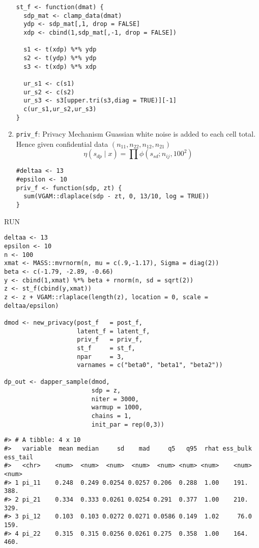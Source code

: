 \begin{enumerate}
\begin{verbatim}
st_f <- function(dmat) {
  sdp_mat <- clamp_data(dmat)
  ydp <- sdp_mat[,1, drop = FALSE]
  xdp <- cbind(1,sdp_mat[,-1, drop = FALSE])

  s1 <- t(xdp) %*% ydp
  s2 <- t(ydp) %*% ydp
  s3 <- t(xdp) %*% xdp

  ur_s1 <- c(s1)
  ur_s2 <- c(s2)
  ur_s3 <- s3[upper.tri(s3,diag = TRUE)][-1]
  c(ur_s1,ur_s2,ur_s3)
}
\end{verbatim}
\item
  \texttt{priv\_f}: Privacy Mechanism
  Guassian white noise is added to each cell total. Hence given
  confidential data \((n_{11}, n_{22}, n_{12}, n_{21})\)
  \[
  \eta(s_{dp} \mid x) = \prod \phi(s_{sd}; n_{ij}, 100^2)
  \]

\begin{verbatim}
#deltaa <- 13
#epsilon <- 10
priv_f <- function(sdp, zt) {
  sum(VGAM::dlaplace(sdp - zt, 0, 13/10, log = TRUE))
}
\end{verbatim}
\end{enumerate}

RUN

\begin{verbatim}
deltaa <- 13
epsilon <- 10
n <- 100
xmat <- MASS::mvrnorm(n, mu = c(.9,-1.17), Sigma = diag(2))
beta <- c(-1.79, -2.89, -0.66)
y <- cbind(1,xmat) %*% beta + rnorm(n, sd = sqrt(2))
z <- st_f(cbind(y,xmat))
z <- z + VGAM::rlaplace(length(z), location = 0, scale = deltaa/epsilon)

dmod <- new_privacy(post_f   = post_f,
                    latent_f = latent_f,
                    priv_f   = priv_f,
                    st_f     = st_f,
                    npar     = 3,
                    varnames = c("beta0", "beta1", "beta2"))

dp_out <- dapper_sample(dmod,
                        sdp = z,
                        niter = 3000,
                        warmup = 1000,
                        chains = 1,
                        init_par = rep(0,3))
\end{verbatim}

\begin{verbatim}
#> # A tibble: 4 x 10
#>   variable  mean median     sd    mad     q5   q95  rhat ess_bulk ess_tail
#>   <chr>    <num>  <num>  <num>  <num>  <num> <num> <num>    <num>    <num>
#> 1 pi_11    0.248  0.249 0.0254 0.0257 0.206  0.288  1.00    191.      388.
#> 2 pi_21    0.334  0.333 0.0261 0.0254 0.291  0.377  1.00    210.      329.
#> 3 pi_12    0.103  0.103 0.0272 0.0271 0.0586 0.149  1.02     76.0     159.
#> 4 pi_22    0.315  0.315 0.0256 0.0261 0.275  0.358  1.00    164.      460.
\end{verbatim}

